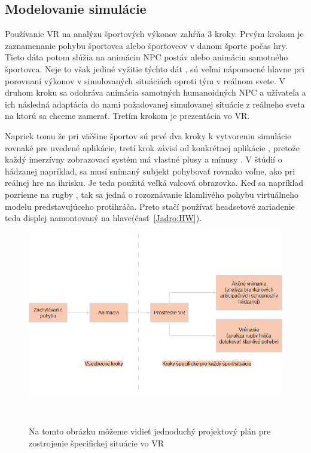 \documentclass[10pt,twoside,slovak,a4paper]{article}										%
\begin{document}
\subsection{Modelovanie simulácie} \label{SW:model}
Používanie VR na analýzu športových výkonov zahŕňa 3 kroky. Prvým krokom je zaznamenanie pohybu športovca alebo športovcov v danom športe počas hry. Tieto dáta potom slúžia na animáciu NPC postáv alebo animáciu samotného športovca. Neje to však jediné vyžitie týchto dát , sú veľmi nápomocné hlavne pri porovnaní výkonov v simulovaných situáciách oproti tým v reálnom svete. V druhom kroku sa odohráva animácia samotných humanoidných NPC a užívateľa a ich následná adaptácia do nami požadovanej simulovanej situácie z reálneho sveta na ktorú sa chceme zamerať. Tretím krokom je prezentácia vo VR.

Napriek tomu že pri väčšine športov sú prvé dva kroky k vytvoreniu simulácie rovnaké pre uvedené aplikácie, tretí krok závisí od konkrétnej aplikácie , pretože každý imerzívny zobrazovací systém má vlastné plusy a mínusy . V štúdií o hádzanej napríklad, sa musí snímaný subjekt pohybovať rovnako voľne, ako pri reálnej hre na ihrisku. Je teda použitá veľká valcová obrazovka. Keď sa napríklad pozrieme na rugby , tak sa jedná o rozoznávanie klamlivého pohybu virtuálneho modelu predstavujúceho protihráča. Preto stačí používať headsetové zariadenie teda displej namontovaný na hlave(časť~\ref{Jadro:HW}). ~\cite{Hlavny:zdroj}

\begin{figure}[htbp]
\centering
\includegraphics[scale=0.4]{model.png}
\caption{Na tomto obrázku môžeme vidieť jednoduchý projektový plán pre zostrojenie špecifickej situácie vo VR}  ~\cite{Hlavny:zdroj}
\label{fig}
\end{figure}
\end{document}
